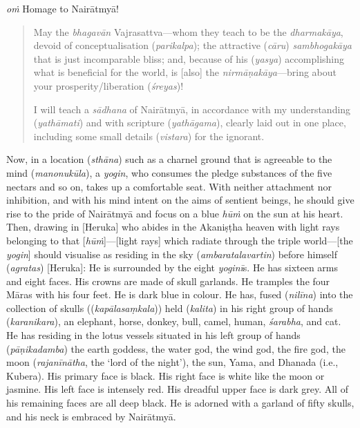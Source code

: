 \documentclass[naipra.tex]{subfiles}
\begin{document}
\noindent \emph{oṁ} Homage to Nairātmyā!

\begin{quote}
	May the \emph{bhagavān} Vajrasattva—whom they teach to be the \emph{dharmakāya}, devoid of conceptualisation (\emph{parikalpa}); the attractive (\emph{cāru}) \emph{sambhogakāya} that is just incomparable bliss; and, because of his (\emph{yasya}) accomplishing what is beneficial for the world, is [also] the \emph{nirmāṇakāya}—bring about your prosperity/liberation (\emph{śreyas})!

	I will teach a \emph{sādhana} of Nairātmyā, in accordance with my understanding (\emph{yathāmati}) and with scripture (\emph{yathāgama}), clearly laid out in one place, including some small details (\emph{vistara}) for the ignorant.
\end{quote}

Now, in a location (\emph{sthāna}) such as a charnel ground that is agreeable to the mind (\emph{manonukūla}), a \emph{yogin}, who consumes the pledge substances of the five nectars and so on, takes up a comfortable seat.
With neither attachment nor inhibition, and with his mind intent on the aims of sentient beings, he should give rise to the pride of Nairātmyā and focus on a blue \emph{hūṁ} on the sun at his heart.
Then, drawing in [Heruka] who abides in the Akaniṣṭha heaven with light rays belonging to that [\emph{hūṁ}]—[light rays] which radiate through the triple world—[the \emph{yogin}] should visualise as residing in the sky (\emph{ambaratalavartin}) before himself (\emph{agratas}) [Heruka]:
He is surrounded by the eight \emph{yoginī}s.
He has sixteen arms and eight faces.
His crowns are made of skull garlands.
He tramples the four Māras with his four feet.
He is dark blue in colour.
He has, fused (\emph{nilīna}) into the collection of skulls ((\emph{kapālasaṃkala})) held (\emph{kalita}) in his right group of hands (\emph{karanikara}), an elephant, horse, donkey, bull, camel, human, \emph{śarabha}, and cat.
He has residing in the lotus vessels situated in his left group of hands (\emph{pāṇikadamba}) the earth goddess, the water god, the wind god, the fire god, the moon (\emph{rajanīnātha}, the `lord of the night'), the sun, Yama, and Dhanada (i.e., Kubera).
His primary face is black.
His right face is white like the moon or jasmine. 
His left face is intensely red.
His dreadful upper face is dark grey.
All of his remaining faces are all deep black.
He is adorned with a garland of fifty skulls, and his neck is embraced by Nairātmyā. 
\end{document}
